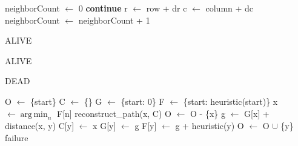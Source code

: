 \documentclass{article}
\DeclareMathOperator*{\argmin}{arg\,min}
\begin{document}
\begin{algorithmic}
        \State neighborCount $\gets$ 0
                    \State \textbf{continue}
                \EndIf
                \State r $\gets$ row + dr
                \State c $\gets$ column + dc
                    \State neighborCount $\gets$ neighborCount + 1
                \EndIf
            \EndFor
        \EndFor

            \State \Return ALIVE
        \EndIf

            \State \Return ALIVE
        \EndIf

        \State \Return DEAD
    \EndFunction
\end{algorithmic}

\newpage

\begin{algorithmic}
        \State O $\gets$ \{start\}
        \State C $\gets$ \{\}
        \State G $\gets$ \{start: 0\}
        \State F $\gets$ \{start: heuristic(start)\}
            \State x $\gets \argmin_n$ F[n]
                \State \Return reconstruct\_path(x, C)
            \EndIf
            \State O $\gets$ O - \{x\}
                \State g $\gets$ G[x] + distance(x, y)
                    \State C[y] $\gets$ x
                    \State G[y] $\gets$ g
                    \State F[y] $\gets$ g + heuristic(y)
                    \State O $\gets$ O $\cup$ \{y\}
                \EndIf
            \EndFor
        \EndWhile
        \State \Return failure
    \EndFunction
\end{algorithmic}

\newpage
\end{document}
